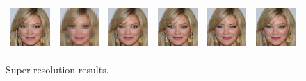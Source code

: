 \begin{figure}
\begin{center}
\begin{tabular}{cccccc}
      \includegraphics[width=.15\textwidth]{Chapter2/samples/super-resolution/table/3/x.png} &   
      \includegraphics[width=.15\textwidth]{Chapter2/samples/super-resolution/table/3/y.png} &
      \includegraphics[width=.15\textwidth]{Chapter2/samples/super-resolution/table/3/hcflow.png} &
      \includegraphics[width=.15\textwidth]{Chapter2/samples/super-resolution/table/3/sr3.png} & 
      \includegraphics[width=.15\textwidth]{Chapter2/samples/super-resolution/table/3/Song.png} &
      \includegraphics[width=.15\textwidth]{Chapter2/samples/super-resolution/table/3/DV.png} \\
  \end{tabular}
  \endgroup
  \end{center}
  \caption{Super-resolution results.}
  \label{fig:super-resolution}
\end{figure}



